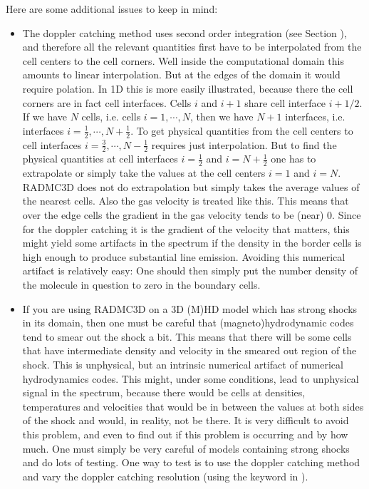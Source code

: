 \documentclass[letterpaper,10pt,english]{sphinxmanual}
\begin{document}
Here are some additional issues to keep in mind:
\begin{itemize}
\item {} 
The doppler catching method uses second order integration (see Section
{\hyperref[\detokenize{imagesspectra:sec-second-order}]{}}), and therefore all the relevant quantities first
have to be interpolated from the cell centers to the cell corners. Well
inside the computational domain this amounts to linear interpolation. But
at the edges of the domain it would require  polation.
In 1\sphinxhyphen{}D this is more easily illustrated, because
there the cell corners are in fact cell interfaces. Cells \(i\) and \(i+1\)
share cell interface \(i+1/2\). If we have \(N\) cells, i.e. cells
\(i=1,\cdots,N\), then we have \(N+1\) interfaces, i.e. interfaces
\(i=\tfrac{1}{2},\cdots,N+\tfrac{1}{2}\). To get physical quantities from
the cell centers to cell interfaces
\(i=\tfrac{3}{2},\cdots,N-\tfrac{1}{2}\) requires just interpolation. But
to find the physical quantities at cell interfaces \(i=\tfrac{1}{2}\) and
\(i=N+\tfrac{1}{2}\) one has to extrapolate or simply take the values at
the cell centers \(i=1\) and \(i=N\). RADMC\sphinxhyphen{}3D does not do
extrapolation but simply takes the average values of the nearest
cells. Also the gas velocity is treated like this. This means that over
the edge cells the gradient in the gas velocity tends to be (near)
0. Since for the doppler catching it is the gradient of the velocity that
matters, this might yield some artifacts in the spectrum if the density in
the border cells is high enough to produce substantial line
emission. Avoiding this numerical artifact is relatively easy: One should
then simply put the number density of the molecule in question to zero in
the boundary cells.

\item {} 
If you are using RADMC\sphinxhyphen{}3D on a 3\sphinxhyphen{}D (M)HD model which has strong shocks
in its domain, then one must be careful that (magneto\sphinxhyphen{})hydrodynamic codes
tend to smear out the shock a bit. This means that there will be some
cells that have intermediate density and velocity in the smeared out
region of the shock. This is unphysical, but an intrinsic numerical
artifact of numerical hydrodynamics codes. This might, under some
conditions, lead to unphysical signal in the spectrum, because there would
be cells at densities, temperatures and velocities that would be in
between the values at both sides of the shock and would, in reality, not
be there. It is very difficult to avoid this problem, and even to find out
if this problem is occurring and by how much. One must simply be very
careful of models containing strong shocks and do lots of testing.  One
way to test is to use the doppler catching method and vary the doppler
catching resolution (using the 
keyword in ).


\end{itemize}
\end{document}
